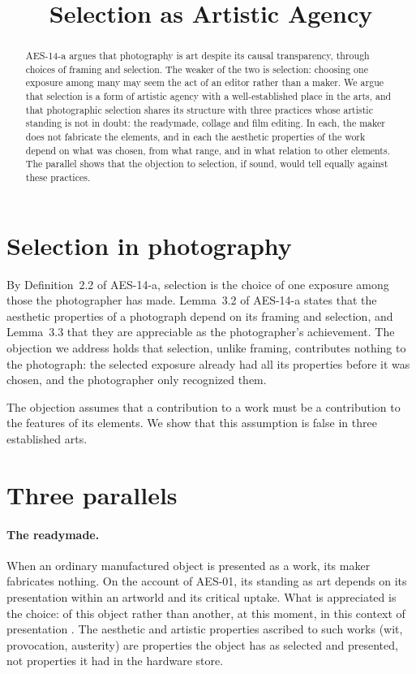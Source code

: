 \documentclass{situationist-preprint}
\title{Selection as Artistic Agency}
\begin{document}
\maketitle

\begin{abstract}
AES-14-a argues that photography is art despite its causal transparency, through choices of framing and selection. The weaker of the two is selection: choosing one exposure among many may seem the act of an editor rather than a maker. We argue that selection is a form of artistic agency with a well-established place in the arts, and that photographic selection shares its structure with three practices whose artistic standing is not in doubt: the readymade, collage and film editing. In each, the maker does not fabricate the elements, and in each the aesthetic properties of the work depend on what was chosen, from what range, and in what relation to other elements. The parallel shows that the objection to selection, if sound, would tell equally against these practices.
\end{abstract}

\section{Selection in photography}

By Definition~2.2 of AES-14-a, selection is the choice of one exposure among those the photographer has made. Lemma~3.2 of AES-14-a states that the aesthetic properties of a photograph depend on its framing and selection, and Lemma~3.3 that they are appreciable as the photographer's achievement. The objection we address holds that selection, unlike framing, contributes nothing to the photograph: the selected exposure already had all its properties before it was chosen, and the photographer only recognized them.

The objection assumes that a contribution to a work must be a contribution to the features of its elements. We show that this assumption is false in three established arts.

\section{Three parallels}

\paragraph{The readymade.} When an ordinary manufactured object is presented as a work, its maker fabricates nothing. On the account of AES-01, its standing as art depends on its presentation within an artworld and its critical uptake. What is appreciated is the choice: of this object rather than another, at this moment, in this context of presentation \citep{Danto1964}. The aesthetic and artistic properties ascribed to such works (wit, provocation, austerity) are properties the object has as selected and presented, not properties it had in the hardware store.
\end{document}
